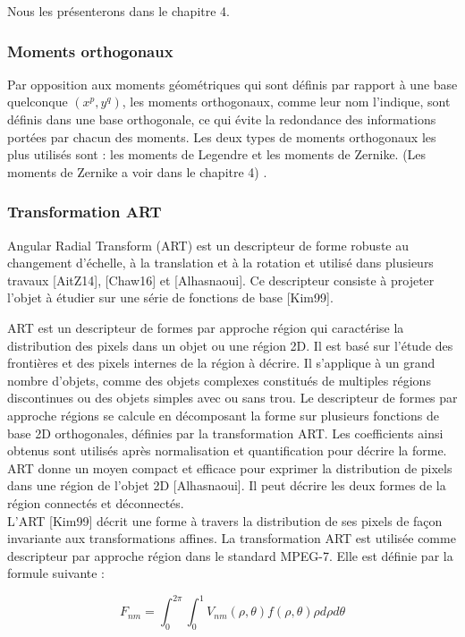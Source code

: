 Nous les présenterons dans le chapitre 4.


\subsubsection{Moments orthogonaux}
Par opposition aux moments géométriques qui sont définis par rapport à une base quelconque $(x^p, y^q)$, les moments orthogonaux, comme leur nom l’indique, sont définis dans une base orthogonale, ce qui évite la redondance des informations portées par chacun des moments. Les deux types de moments orthogonaux les plus utilisés sont : les moments de Legendre et les moments de Zernike. (Les moments de Zernike a voir dans le chapitre 4) .

\subsubsection{Transformation ART}
Angular Radial Transform (ART) est un descripteur de forme robuste au changement d’échelle, à la translation et à la rotation et utilisé dans plusieurs travaux [AitZ14], [Chaw16] et [Alhasnaoui]. Ce descripteur consiste à projeter l’objet à étudier sur une série de fonctions de base [Kim99].

ART est un descripteur de formes par approche région qui caractérise la distribution des pixels dans un objet ou une région 2D. Il est basé sur l’étude des frontières et des pixels internes de la région à décrire. Il s’applique à un grand nombre d’objets, comme des objets complexes constitués de multiples régions discontinues ou des objets simples avec ou sans trou. Le descripteur de formes par approche régions se calcule en décomposant la forme sur plusieurs fonctions de base 2D orthogonales, définies par la transformation ART. Les coefficients ainsi obtenus sont utilisés après normalisation et quantification pour décrire la forme. ART donne un moyen compact et efficace pour exprimer la distribution de pixels dans une région de l’objet 2D [Alhasnaoui]. Il peut décrire les deux formes de la région connectés et déconnectés.\\

L’ART [Kim99] décrit une forme à travers la distribution de ses pixels de façon invariante
aux transformations affines. La transformation ART est utilisée comme descripteur par approche
région dans le standard MPEG-7. Elle est définie par la formule suivante :

\begin{equation}
    F_{nm} = {\int }_0^{2\pi} {\int }_0^{1} V_{nm}(\rho, \theta) f(\rho, \theta) \rho d\rho  d\theta
\end{equation}

